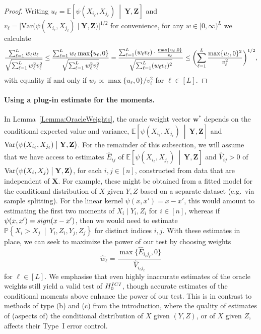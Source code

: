 \documentclass[12pt]{article}
\newcommand{\EEst}[2]{\mathbb{E}\left[{#1}\  \middle| \ {#2}\right]}
\newcommand{\PPst}[2]{\mathbb{P}\left\{{#1}\  \middle| \ {#2}\right\}}
\newcommand{\bX}{\mathbf{X}}
\newcommand{\bY}{\mathbf{Y}}
\newcommand{\bZ}{\mathbf{Z}}
\newcommand{\bw}{\mathbf{w}}
\begin{document}
\begin{proof}
Writing $
u_\ell = \EEst{\psi(X_{i_\ell},X_{j_\ell})}{\bY,\bZ}$ and $v_\ell = \bigl[\mathrm{Var}\bigl(\psi(X_{i_\ell},X_{j_\ell}) \mid \bY,\bZ\bigr)\bigr]^{1/2}$ for convenience, for any $w\in[0,\infty)^L$ we calculate
\[ \frac{\sum_{\ell=1}^L w_\ell u_\ell}{\sqrt{\sum_{\ell=1}^L w_\ell^2 v_\ell^2}} \leq \frac{\sum_{\ell=1}^L w_\ell \max\{u_\ell,0\}}{\sqrt{\sum_{\ell=1}^L w_\ell^2 v_\ell^2}} \\
= \frac{\sum_{\ell=1}^L (w_\ell v_\ell) \cdot \frac{\max\{u_\ell,0\}}{v_\ell}}{\sqrt{\sum_{\ell=1}^L (w_\ell v_\ell)^2}}\leq \biggl(\sum_{\ell=1}^L \frac{\max\{u_\ell,0\}^2}{v_\ell^2}\biggr)^{1/2},
\]
with equality if and only if $w_\ell \propto \max\{u_\ell,0\}/v_\ell^2$ for $\ell \in [L]$.
\end{proof}

\paragraph{Using a plug-in estimate for the moments.}
In Lemma~\ref{Lemma:OracleWeights}, the oracle weight vector $\bw^*$ depends on the conditional expected value and variance, $\EEst{\psi(X_{i_\ell}, X_{j_\ell})}{\bY, \bZ}$ and $\mathrm{Var}\bigl(\psi(X_{i_\ell}, X_{j_\ell}) \bigm| \bY, \bZ\bigr)$.  For the remainder of this subsection, we will assume that we have access to estimates $\hat{E}_{ij}$ of $\EEst{\psi(X_{i_\ell}, X_{j_\ell})}{\bY, \bZ}$ and $\hat{V}_{ij} > 0$ of $\mathrm{Var}\bigl(\psi(X_i,X_j) \bigm| \bY,\bZ\bigr)$, for each $i,j \in [n]$, constructed from data that are independent of $\bX$.  For example, these might be obtained from a fitted model for the conditional distribution of $X$ given $Y,Z$ based on a separate dataset (e.g.~via sample splitting).  For the linear kernel $\psi(x,x')=x-x'$, this would amount to estimating the first two moments of $X_i\mid Y_i, Z_i$ for $i \in [n]$, whereas if $\psi(x,x') = \textnormal{sign}(x-x')$, then we would need to estimate $\PPst{X_i > X_j }{ Y_i, Z_i,Y_j,Z_j}$ for distinct indices $i,j$.  With these estimates in place, we can seek to maximize the power of our test by choosing weights
\[
\hat{w}_\ell =\frac{\max\{\hat{E}_{i_\ell j_\ell},0\}}{\hat{V}_{i_\ell j_\ell}}
\]
for $\ell \in [L]$. We emphasise that even highly inaccurate estimates of the oracle weights still yield a valid test of $H_0^{\textnormal{ICI}}$, though accurate estimates of the conditional moments above enhance the power of our test.  This is in contrast to methods of type (b) and (c) from the introduction, where the quality of estimates of (aspects of) the conditional distribution of $X$ given $(Y,Z)$, or of $X$ given $Z$, affects their Type~I error control.
\end{document}
